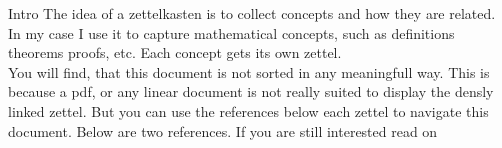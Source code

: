\documentclass[class=article, crop=false]{standalone}
\begin{document}
\begin{zettel}{Intro}
The idea of a zettelkasten is to collect concepts and how they are related. In my case I use it to capture mathematical concepts, such as definitions theorems proofs, etc. Each concept gets its own zettel.\\

You will find, that this document is not sorted in any meaningfull way. This is because a pdf, or any linear document is not really suited to display the densly linked zettel. But you can use the references below each zettel to navigate this document.
Below are two references. If you are still interested read on

\end{zettel}
\end{document}
